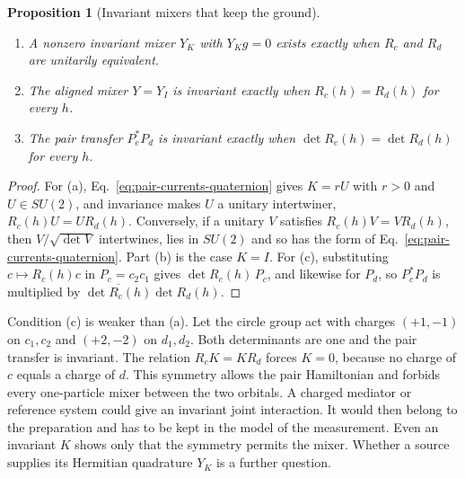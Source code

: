 \documentclass[11pt]{article}
\newtheorem{proposition}{Proposition}[section]
\theoremstyle{definition}
\begin{document}
\begin{proposition}[Invariant mixers that keep the ground]
\label{prop:pair-currents-invariant-mixer}
\begin{enumerate}
\item[(a)] A nonzero invariant mixer $Y_K$ with $Y_Kg=0$ exists exactly when $R_c$ and $R_d$ are unitarily equivalent.
\item[(b)] The aligned mixer $Y=Y_I$ is invariant exactly when $R_c(h)=R_d(h)$ for every $h$.
\item[(c)] The pair transfer $P_c^*P_d$ is invariant exactly when $\det R_c(h)=\det R_d(h)$ for every $h$.
\end{enumerate}
\end{proposition}
\begin{proof}
For (a), Eq.~\eqref{eq:pair-currents-quaternion} gives $K=rU$ with $r>0$ and $U\in SU(2)$, and invariance makes $U$ a unitary intertwiner, $R_c(h)U=UR_d(h)$. Conversely, if a unitary $V$ satisfies $R_c(h)V=VR_d(h)$, then $V/\sqrt{\det V}$ intertwines, lies in $SU(2)$ and so has the form of Eq.~\eqref{eq:pair-currents-quaternion}. Part (b) is the case $K=I$. For (c), substituting $c\mapsto R_c(h)c$ in $P_c=c_2c_1$ gives $\det R_c(h)\,P_c$, and likewise for $P_d$, so $P_c^*P_d$ is multiplied by $\overline{\det R_c(h)}\det R_d(h)$.
\end{proof}

Condition (c) is weaker than (a). Let the circle group act with charges $(+1,-1)$ on $c_1,c_2$ and $(+2,-2)$ on $d_1,d_2$. Both determinants are one and the pair transfer is invariant. The relation $R_cK=KR_d$ forces $K=0$, because no charge of $c$ equals a charge of $d$. This symmetry allows the pair Hamiltonian and forbids every one-particle mixer between the two orbitals. A charged mediator or reference system could give an invariant joint interaction. It would then belong to the preparation and has to be kept in the model of the measurement. Even an invariant $K$ shows only that the symmetry permits the mixer. Whether a source supplies its Hermitian quadrature $Y_K$ is a further question.
\end{document}
